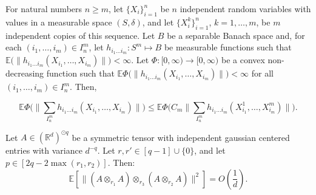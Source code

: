 \documentclass[]{article}
\numberwithin{equation}{section}
\theoremstyle{definition}
\newcommand{\RR}{\mathbb{R}}
\newcommand{\EE}{\mathbb{E}}
\begin{document}
\begin{lemma} For natural numbers $n \ge m$, let $\{X_i\}_{i=1}^n$ be $n$ independent random variables with values in a measurable space $(S, \delta)$, and let $\{X_i^k\}_{i=1}^n$, $k = 1, \ldots, m$, be $m$ independent copies of this sequence. Let $B$ be a separable Banach space and, for each $(i_1, \ldots, i_m) \in I_n^m$, let $h_{i_1 \ldots i_m} : S^m \mapsto B$ be measurable functions such that $\mathbb{E}\big(\|h_{i_1 \ldots i_m}(X_{i_1}, \ldots, X_{i_m})\|\big) < \infty$. Let $\Phi : [0, \infty) \to [0, \infty)$ be a convex non-decreasing function such that $\mathbb{E}\Phi\big(\|h_{i_1 \ldots i_m}(X_{i_1}, \ldots, X_{i_m})\|\big) < \infty$ for all $(i_1, \ldots, i_m) \in I_n^m$. Then,

$$
\mathbb{E}\Phi\Big(\Big\|\sum_{I_n^m} h_{i_1 \ldots i_m}(X_{i_1}, \ldots, X_{i_m})\Big\|\Big) \le \mathbb{E}\Phi\Big(C_m \Big\|\sum_{I_n^m} h_{i_1 \ldots i_m}(X_{i_1}^1, \ldots, X_{i_m}^m)\Big\|\Big).
$$
 \label{lemma:decoupling}
\end{lemma}

\begin{lemma}
    Let $A \in (\RR^{d})^{\odot q}$ be a symmetric tensor with independent gaussian centered entries with variance $d^{-q}$. Let $r,r' \in [q-1]\cup\{0\}$, and let $p \in [2q - 2\max(r_1,r_2)]$. 
    Then:
    \[
    \EE \left [ \| (A \otimes_{r_1} A) \otimes_{r_3} (A \otimes_{r_2} A)\|^{2}\right ] = O \left( \dfrac{1}{d}\right ).
    \]
\label{lemma:double_contraction_expectation}
\end{lemma}
\end{document}
